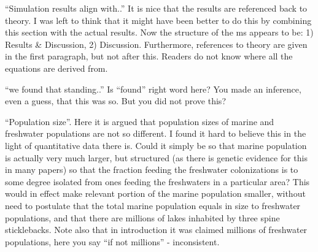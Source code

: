
\begin{point}{\revref}
``Simulation results align with..'' It is nice that the results are referenced back to theory. I was left to think that it might have been better to do this by combining this section with the actual results. Now the structure of the ms appears to be: 1) Results \& Discussion, 2) Discussion. Furthermore, references to theory are given in the first paragraph, but not after this. Readers do not know where all the equations are derived from.
\end{point}


\begin{point}{\revref}
``we found that standing..'' Is ``found'' right word here? You made an inference, even a guess, that this was so. But you did not prove this?
\end{point}


\begin{point}{\revref}
``Population size''. Here it is argued that population sizes of marine and freshwater populations are not so different. I found it hard to believe this in the light of quantitative data there is. Could it simply be so that marine population is actually very much larger, but structured (as there is genetic evidence for this in many papers) so that the fraction feeding the freshwater colonizations is to some degree isolated from ones feeding the freshwaters in a particular area? This would in effect make relevant portion of the marine population smaller, without need to postulate that the total marine population equals in size to freshwater populations, and that there are millions of lakes inhabited by three spine sticklebacks. Note also that in introduction it was claimed millions of freshwater populations, here you say ``if not millions'' - inconsistent.
\end{point}

